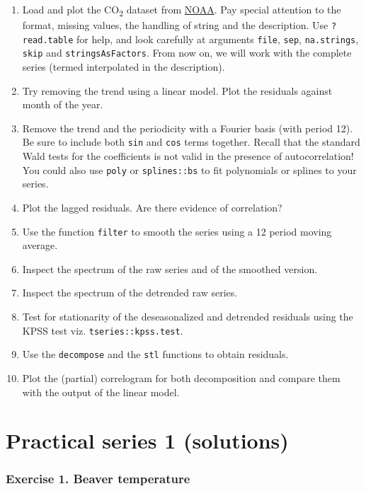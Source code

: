 \documentclass[]{book}
\providecommand{\tightlist}{%
  \setlength{\itemsep}{0pt}\setlength{\parskip}{0pt}}
\begin{document}
\begin{enumerate}
\def\labelenumi{\arabic{enumi}.}
\tightlist
\item
  Load and plot the CO\textsubscript{2} dataset from
  \href{ftp://aftp.cmdl.noaa.gov/products/trends/co2/co2_mm_mlo.txt}{NOAA}.
  Pay special attention to the format, missing values, the handling of
  string and the description. Use \texttt{?read.table} for help, and
  look carefully at arguments \texttt{file}, \texttt{sep},
  \texttt{na.strings}, \texttt{skip} and \texttt{stringsAsFactors}. From
  now on, we will work with the complete series (termed interpolated in
  the description).
\item
  Try removing the trend using a linear model. Plot the residuals
  against month of the year.
\item
  Remove the trend and the periodicity with a Fourier basis (with period
  12). Be sure to include both \texttt{sin} and \texttt{cos} terms
  together. Recall that the standard Wald tests for the coefficients is
  not valid in the presence of autocorrelation! You could also use
  \texttt{poly} or \texttt{splines::bs} to fit polynomials or splines to
  your series.
\item
  Plot the lagged residuals. Are there evidence of correlation?
\item
  Use the function \texttt{filter} to smooth the series using a 12
  period moving average.
\item
  Inspect the spectrum of the raw series and of the smoothed version.
\item
  Inspect the spectrum of the detrended raw series.
\item
  Test for stationarity of the deseasonalized and detrended residuals
  using the KPSS test viz. \texttt{tseries::kpss.test}.
\item
  Use the \texttt{decompose} and the \texttt{stl} functions to obtain
  residuals.
\item
  Plot the (partial) correlogram for both decomposition and compare them
  with the output of the linear model.
\end{enumerate}

\chapter{Practical series 1
(solutions)}\label{practical-series-1-solutions}

\subsection{Exercise 1. Beaver
temperature}\label{exercise-1.-beaver-temperature-1}
\end{document}
